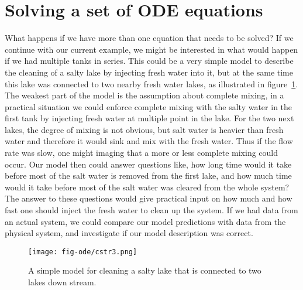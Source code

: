 \documentclass[graybox,sectrefs,envcountresetchap,open=right,final]{svmonodo}
\begin{document}
\section{Solving a set of ODE equations}
What happens if we have more than one equation that needs to be solved? If we continue with our current example, we might be interested in what would happen 
if we had multiple tanks in series. This could be a very simple model to describe the cleaning  of a salty lake by injecting fresh water into it, but at 
the same time this lake was connected to two nearby fresh water lakes, as illustrated in figure~\ref{fig:ode:cstr3}. The weakest part of the model is the assumption about 
complete mixing, in a practical situation we could enforce complete mixing with the salty water in the first tank by injecting fresh water at multiple point in the 
lake. For the two next lakes, the degree of mixing is not obvious, but salt water is heavier than fresh water and therefore it would sink and mix with the fresh water. Thus
if the flow rate was slow, one might imaging that a more or less complete mixing could occur. Our model then could answer questions like, how long time would it take before most
of the salt water is removed from the first lake, and how much time would it take before most of the salt water was cleared from the whole system? The answer to 
these questions would give practical input on how much and how fast one should inject the fresh water to clean up the system. If we had 
data from an actual system, we could compare our model predictions with data from the physical system, and investigate if our model description was correct. 

\begin{figure}[!ht]  %
  \centerline{\texttt{[image: fig-ode/cstr3.png]}}
  \caption{
  A simple model for cleaning a salty lake that is connected to two lakes down stream. \label{fig:ode:cstr3}
  }
\end{figure}
\end{document}
